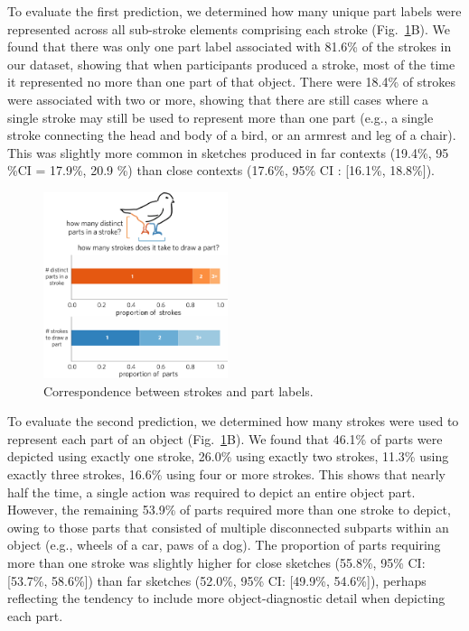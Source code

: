 \documentclass[10pt,letterpaper]{article}
\newcommand{\jefan}[1]{{\color{blue}{[jefan: #1]}}}
\begin{document}
To evaluate the first prediction, we determined how many unique part labels were represented across all sub-stroke elements comprising each stroke (Fig.~\ref{stroke_to_part}B). 
We found that there was only one part label associated with 81.6\% of the strokes in our dataset, showing that when participants produced a stroke, most of the time it represented no more than one part of that object. 
There were 18.4\% of strokes were associated with two or more, showing that there are still cases where a single stroke may still be used to represent more than one part (e.g., a single stroke connecting the head and body of a bird, or an armrest and leg of a chair). 
This was slightly more common in sketches produced in far contexts (19.4\%, 95 \%CI = 17.9\%, 20.9 \%) than close contexts (17.6\%, 95\% CI : [16.1\%, 18.8\%]). 

\begin{figure}[htbp]
\centering
\includegraphics[width=0.48\textwidth]{figures/5_stroke_part_relationship.pdf}
\caption{Correspondence between strokes and part labels. \jefan{Horizontal axis labels here should be aligned.}}
\label{stroke_to_part}
\end{figure}

To evaluate the second prediction, we determined how many strokes were used to represent each part of an object (Fig.~\ref{stroke_to_part}B). 
We found that 46.1\% of parts were depicted using exactly one stroke, 26.0\% using exactly two strokes, 11.3\% using exactly three strokes, 16.6\% using four or more strokes. 
This shows that nearly half the time, a single action was required to depict an entire object part. 
However, the remaining 53.9\% of parts required more than one stroke to depict, owing to those parts that consisted of multiple disconnected subparts within an object (e.g., wheels of a car, paws of a dog).
\jefan{This should be verified in some way by subsetting on those feature columns that actually are likely to contain multiple instances per object.}
The proportion of parts requiring more than one stroke was slightly higher for close sketches (55.8\%, 95\% CI: [53.7\%, 58.6\%]) than far sketches (52.0\%, 95\% CI: [49.9\%, 54.6\%]), perhaps reflecting the tendency to include more object-diagnostic detail when depicting each part. 
\end{document}
